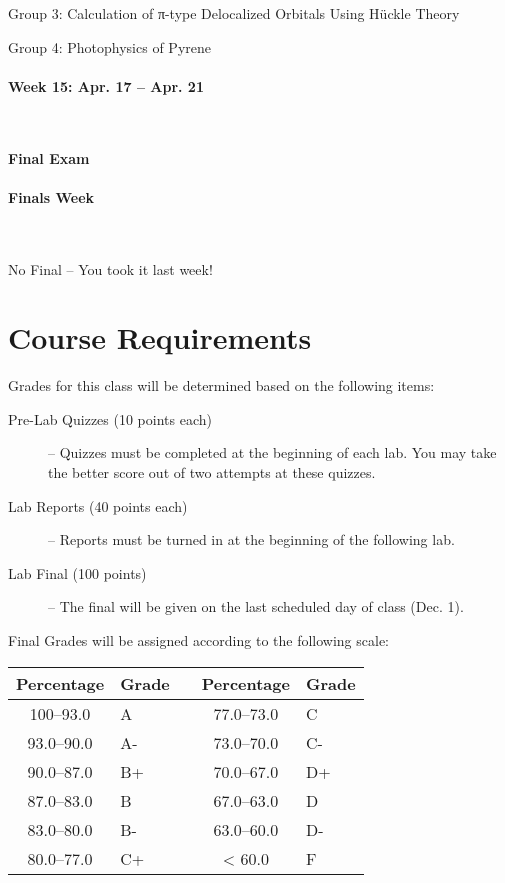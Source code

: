 \documentclass[12pt, letterpaper]{article}
\begin{document}
Group 3: Calculation of π-type Delocalized Orbitals Using Hückle Theory

Group 4: Photophysics of Pyrene

\paragraph{Week 15: Apr. 17 -- Apr. 21}~

\textbf{Final Exam}

\paragraph{Finals Week}~

No Final -- You took it last week!

\section*{Course Requirements}
Grades for this class will be determined based on the following items:

\begin{description}
	\item[Pre-Lab Quizzes (10 points each)] -- Quizzes must be completed at the beginning of each lab. You may take the better score out of two attempts at these quizzes.
	\item[Lab Reports (40 points each)] -- Reports must be turned in at the beginning of the following lab.
	\item[Lab Final (100 points)] -- The final will be given on the last scheduled day of class (Dec. 1).
\end{description}

\noindent Final Grades will be assigned according to the following scale:

\begin{tabular}{cl|c|cl}
	Percentage & Grade &  & Percentage & Grade \\ \midrule
	100--93.0  & A     &  & 77.0--73.0 & C     \\
	93.0--90.0 & A-    &  & 73.0--70.0 & C-    \\
	90.0--87.0 & B+    &  & 70.0--67.0 & D+    \\
	87.0--83.0 & B     &  & 67.0--63.0 & D     \\
	83.0--80.0 & B-    &  & 63.0--60.0 & D-    \\
	80.0--77.0 & C+    &  & < 60.0     & F
\end{tabular}
\end{document}

